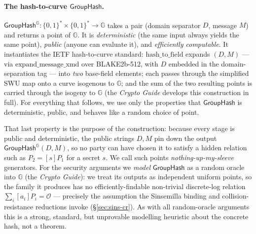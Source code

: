 \documentclass[11pt,a4paper]{article}
\theoremstyle{definition}
\newcommand{\G}{\mathbb{G}}
\newcommand{\GroupHash}{\ensuremath{\mathsf{GroupHash}}}
\begin{document}
\paragraph{The hash-to-curve $\GroupHash$.}
$\GroupHash^{\G} : \{0,1\}^* \times \{0,1\}^* \to \G$ takes a pair
(domain separator $D$, message $M$) and returns a point of $\G$. It is
\emph{deterministic} (the same input always yields the same point),
\emph{public} (anyone can evaluate it), and \emph{efficiently computable}.
It instantiates the IETF hash-to-curve
standard: $\mathrm{hash\_to\_field}$ expands $(D, M)$ --- via
$\mathrm{expand\_message\_xmd}$ over BLAKE2b-512, with $D$ embedded in the
domain-separation tag --- into \emph{two} base-field elements; each passes
through the simplified SWU map onto a curve isogenous to $\G$; and the sum of
the two resulting points is carried through the isogeny to $\G$ (the
\emph{Crypto Guide} develops this construction in full).
For everything that follows, we use only the properties
that $\GroupHash$ is deterministic, public, and behaves like a
random choice of point.

That last property is the purpose of the construction: because every stage
is public and deterministic, the public strings $D, M$ pin down
the output $\GroupHash^{\G}(D,M)$, so no party can have chosen it to satisfy
a hidden relation such as $P_2 = [s]P_1$ for a secret $s$. We call such points
\emph{nothing-up-my-sleeve} generators. For the security arguments
we \emph{model} $\GroupHash$ as a random oracle into $\G$ (the \emph{Crypto Guide}):
we treat its outputs as independent uniform points, so the family it
produces has no efficiently-findable non-trivial discrete-log relation
$\sum_i [a_i] P_i = \mathcal{O}$ --- precisely the assumption the Sinsemilla
binding and collision-resistance reductions invoke (\S\ref{sec:sins-cr}).
As with all random-oracle arguments this is a strong, standard, but
unprovable modelling heuristic about the concrete hash, not a theorem.
\end{document}
